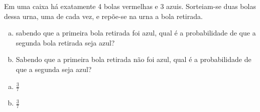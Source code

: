 \begin{ex}
    Em uma caixa há exatamente 4 bolas vermelhas e 3 azuis. Sorteiam-se duas bolas dessa urna, uma de cada vez, e repõe-se na urna a bola retirada.   \begin{enumerate}[(a)]
   \item sabendo que a primeira bola retirada foi azul, qual é a probabilidade de que a segunda bola retirada seja azul?
   \item Sabendo que a primeira bola retirada não foi azul, qual é a probabilidade de que a segunda seja azul?
   \end{enumerate}
     \begin{sol}
      \phantom{A}
      \begin{enumerate} [(a)]
          \item $\frac{3}{7}$
          \item $\frac{3}{7}$
      \end{enumerate}
     \end{sol}
\end{ex}